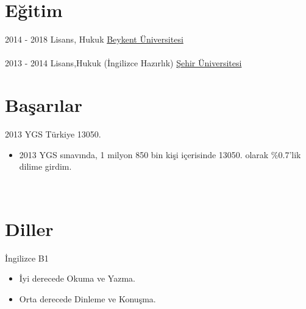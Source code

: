 \documentclass[letterpaper]{alibk} %
\begin{document}
\makeprofile %

\section{Eğitim}

\begin{twenty} %
	\twentyitem
    	{2014 - 2018}
        {}
        {\hspace{0.3cm}Lisans, Hukuk }
        {\href{https://www.beykent.edu.tr/beykent/1736/hukuk-fakultesi/}{\hspace{0.2cm}Beykent Üniversitesi}}
        {}
        {}
        \\
        \\
   	\twentyitem
	    {2013 - 2014}
	    {}
	    {\hspace{0.3cm}Lisans,Hukuk (İngilizce Hazırlık) }
	    {\href{https://www.sehir.edu.tr/tr/}{\hspace{0.2cm}Şehir Üniversitesi}}
	    {}
	    {}    
\end{twenty}

\section{Başarılar}

\begin{twenty} %

	\twentyitem
	{2013 YGS}
	{}
	{\hspace{0.3cm}Türkiye 13050.}
	{}
	{}
	{
		{\begin{itemize}
				\item 2013 YGS sınavında, 1 milyon 850 bin kişi içerisinde 13050. olarak \%0.7'lik dilime girdim.
		\end{itemize}}
	}
	\\

\end{twenty}

\section{Diller}

\begin{twenty} %
	\twentyitem
	{İngilizce}
	{}
	{\hspace{0.3cm}B1}
	{}
	{}
	{\begin{itemize}
			\item İyi derecede Okuma ve Yazma.
			\item Orta derecede Dinleme ve Konuşma.       
	\end{itemize}}
	\\
	
\end{twenty}
\end{document}
